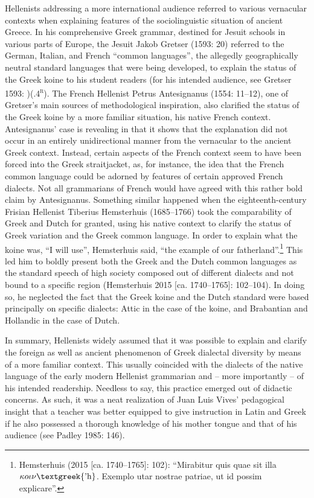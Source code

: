 \documentclass[12pt]{article}
\newenvironment{styleStandard}{\renewcommand\baselinestretch{1.25}\setlength\leftskip{0in}\setlength\rightskip{0in}\setlength\parindent{0.1972in}\setlength\parfillskip{0pt plus 1fil}\setlength\parskip{0in plus 1pt}\writerlistparindent\writerlistleftskip\leavevmode\normalfont\normalsize\writerlistlabel\ignorespaces}{\unskip\vspace{0in plus 1pt}\par}
\newcommand\writerlistleftskip{}
\newcommand\writerlistparindent{}
\newcommand\writerlistlabel{}
\begin{document}
\begin{styleStandard}
Hellenists addressing a more international audience referred to various vernacular contexts when explaining features of the sociolinguistic situation of ancient Greece. In his comprehensive Greek grammar, destined for Jesuit schools in various parts of Europe, the Jesuit Jakob Gretser (1593: 20) referred to the German, Italian, and French “common languages”, the allegedly geographically neutral standard languages that were being developed, to explain the status of the Greek koine to his student readers (for his intended audience, see Gretser 1593: )(.4\textsc{\textsuperscript{r}}). The French Hellenist Petrus Antesignanus (1554: 11–12), one of Gretser’s main sources of methodological inspiration, also clarified the status of the Greek koine by a more familiar situation, his native French context. Antesignanus’ case is revealing in that it shows that the explanation did not occur in an entirely unidirectional manner from the vernacular to the ancient Greek context. Instead, certain aspects of the French context seem to have been forced into the Greek straitjacket, as, for instance, the idea that the French common language could be adorned by features of certain approved French dialects. Not all grammarians of French would have agreed with this rather bold claim by Antesignanus. Something similar happened when the eighteenth-century Frisian Hellenist Tiberius Hemsterhuis (1685–1766) took the comparability of Greek and Dutch for granted, using his native context to clarify the status of Greek variation and the Greek common language. In order to explain what the koine was, “I will use”, Hemsterhuis said, “the example of our fatherland”.\footnote{ Hemsterhuis (2015 [ca. 1740–1765]: 102): “Mirabitur quis quae sit illa $\kappa o\iota \nu \text{\textgreek{'h}}$. Exemplo utar nostrae patriae, ut id possim explicare”.} This led him to boldly present both the Greek and the Dutch common languages as the standard speech of high society composed out of different dialects and not bound to a specific region (Hemsterhuis 2015 [ca. 1740–1765]: 102–104). In doing so, he neglected the fact that the Greek koine and the Dutch standard were based principally on specific dialects: Attic in the case of the koine, and Brabantian and Hollandic in the case of Dutch.
\end{styleStandard}

\begin{styleStandard}
In summary, Hellenists widely assumed that it was possible to explain and clarify the foreign as well as ancient phenomenon of Greek dialectal diversity by means of a more familiar context. This usually coincided with the dialects of the native language of the early modern Hellenist grammarian and – more importantly – of his intended readership. Needless to say, this practice emerged out of didactic concerns. As such, it was a neat realization of Juan Luis Vives’ pedagogical insight that a teacher was better equipped to give instruction in Latin and Greek if he also possessed a thorough knowledge of his mother tongue and that of his audience (see Padley 1985: 146).
\end{styleStandard}
\end{document}
